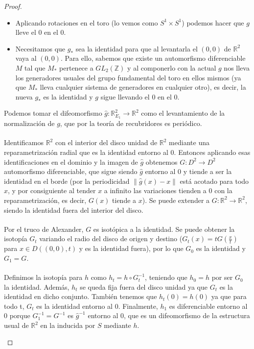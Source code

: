 \begin{proof}
\begin{enumerate}
				\begin{itemize}
					\item Aplicando rotaciones en el toro (lo vemos como $S^1\times S^1$) podemos hacer que $g$ lleve el $0$ en el $0$.
					\item Necesitamos que $g_*$ sea la identidad para que al levantarla el $(0,0)$ de $\mathbb{R}^2$ vaya al $(0,0)$. Para ello, sabemos que existe un automorfismo diferenciable $M$ tal que $M_*$ pertenece a $GL_2(\mathbb{Z})$ y al componerlo con la actual $g$ nos lleva los generadores usuales del grupo fundamental del toro en ellos mismos (ya que $M_*$ lleva cualquier sistema de generadores en cualquier otro), es decir, la nueva $g_*$ es la identidad y $g$ sigue llevando el $0$ en el $0$.
				\end{itemize}
				 
				Podemos tomar el difeomorfismo $\widehat{g}:\mathbb{R}^2_{E_1} \rightarrow \mathbb{R}^2$ como el levantamiento de la normalización de $g$, que por la teoría de recubridores es periódico.\\
				\\ Identificamos $\mathbb{R}^2$ con el interior del disco unidad de $\mathbb{R}^2$ mediante una reparametrización radial que es la identidad entorno al $0$. Entonces aplicando esas identificaciones en el dominio y la imagen de $\widehat{g}$ obtenemos $G:D^2 \rightarrow D^2$ automorfismo diferenciable, que sigue siendo $\widehat{g}$ entorno al $0$ y tiende a ser la identidad en el borde (por la periodicidad $\|\widehat{g}(x) - x\|$ está acotado para todo $x$, y por consiguiente al tender $x$ a infinito las variaciones tienden a $0$ con la reparametrización, es decir, $G(x)$ tiende a $x$). Se puede extender a $G:\mathbb{R}^2 \rightarrow \mathbb{R}^2$, siendo la identidad fuera del interior del disco.\\
				\\ Por el truco de Alexander, $G$ es isotópica a la identidad. Se puede obtener la isotopía $G_t$ variando el radio del disco de origen y destino ($G_t(x) = tG(\frac{x}{t})$ para $x \in D((0,0), t)$ y es la identidad fuera), por lo que $G_0$ es la identidad y $G_1=G$.\\
				\\ Definimos la isotopía para $h$ como $h_t=h\circ G_t^{-1}$, teniendo que $h_0=h$ por ser $G_0$ la identidad. Además, $h_t$ se queda fija fuera del disco unidad ya que $G_t$ es la identidad en dicho conjunto. También tenemos que $h_t(0)=h(0)$ ya que para todo t, $G_t$ es la identidad entorno al $0$. Finalmente, $h_1$ es diferenciable entorno al $0$ porque $G_1^{-1}=G^{-1}$ es $\widehat{g}^{-1}$ entorno al $0$, que es un difeomorfismo de la estructura usual de $\mathbb{R}^2$ en la inducida por $S$ mediante $h$.

\end{enumerate}
\end{proof}
